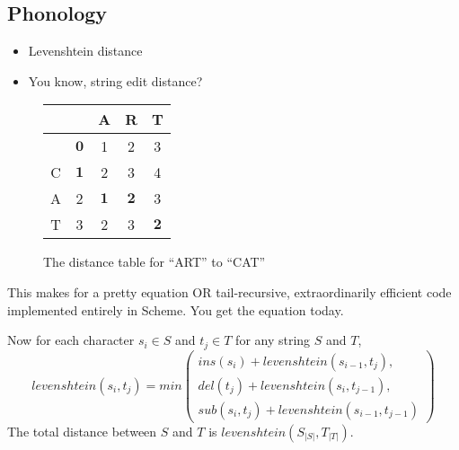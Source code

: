 \documentclass{beamer}
\begin{document}
\subsection{Phonology}
\begin{frame}
  \begin{itemize}
  \item Levenshtein distance
  \item You know, string edit distance?
  \end{itemize}
\begin{figure}
\caption{The distance table for ``ART'' to ``CAT''}

\begin{center}
\begin{tabular}{c|c|c|c|c}
  &   & A & R & T \\
\hline
  & $\mathbf{0}$ & 1 & 2 & 3 \\
\hline
C & $\mathbf{1}$ & 2 & 3 & 4 \\
\hline
A & 2 & $\mathbf{1}$ & $\mathbf{2}$ & 3 \\
\hline
T & 3 & 2 & 3 & $\mathbf{2}$
\end{tabular}

\end{center}

\label{art2cattable}
\end{figure}

\end{frame}
\begin{frame}
    This makes for a pretty equation OR tail-recursive, extraordinarily
    efficient code implemented entirely in Scheme. You get the
    equation today.
\begin{definition}
Now for each character $s_i \in S$ and $t_j \in T$ for any string $S$ and $T$,
\begin{equation}
  levenshtein(s_i,t_j) = min \left(
  \begin{array}{l}
   ins(s_i)+levenshtein(s_{i-1},t_j), \\
 del(t_j)+levenshtein(s_i,t_{j-1}), \\
 sub(s_i,t_j)+levenshtein(s_{i-1},t_{j-1})
   \end{array} \right)
   \label{levequation}
\end{equation}
The total distance between $S$ and $T$ is $levenshtein(S_{|S|},T_{|T|})$.
\end{definition}
\end{frame}
\end{document}
